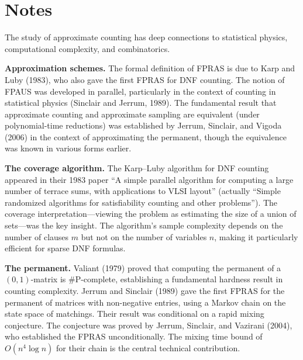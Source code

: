 \documentclass[twoside,12pt]{book}
\theoremstyle{plain}
\theoremstyle{definition}
\theoremstyle{remark}
\begin{document}




\section*{Notes}
\label{sec:notes-11}

The study of approximate counting has deep connections to statistical physics, computational complexity, and combinatorics.

\textbf{Approximation schemes.} The formal definition of FPRAS is due to Karp and Luby (1983), who also gave the first FPRAS for DNF counting. The notion of FPAUS was developed in parallel, particularly in the context of counting in statistical physics (Sinclair and Jerrum, 1989). The fundamental result that approximate counting and approximate sampling are equivalent (under polynomial-time reductions) was established by Jerrum, Sinclair, and Vigoda (2006) in the context of approximating the permanent, though the equivalence was known in various forms earlier.

\textbf{The coverage algorithm.} The Karp--Luby algorithm for DNF counting appeared in their 1983 paper ``A simple parallel algorithm for computing a large number of terrace sums, with applications to VLSI layout'' (actually ``Simple randomized algorithms for satisfiability counting and other problems''). The coverage interpretation---viewing the problem as estimating the size of a union of sets---was the key insight. The algorithm's sample complexity depends on the number of clauses $m$ but not on the number of variables $n$, making it particularly efficient for sparse DNF formulas.

\textbf{The permanent.} Valiant (1979) proved that computing the permanent of a $(0,1)$-matrix is \#P-complete, establishing a fundamental hardness result in counting complexity. Jerrum and Sinclair (1989) gave the first FPRAS for the permanent of matrices with non-negative entries, using a Markov chain on the state space of matchings. Their result was conditional on a rapid mixing conjecture. The conjecture was proved by Jerrum, Sinclair, and Vazirani (2004), who established the FPRAS unconditionally. The mixing time bound of $O(n^4 \log n)$ for their chain is the central technical contribution.
\end{document}

